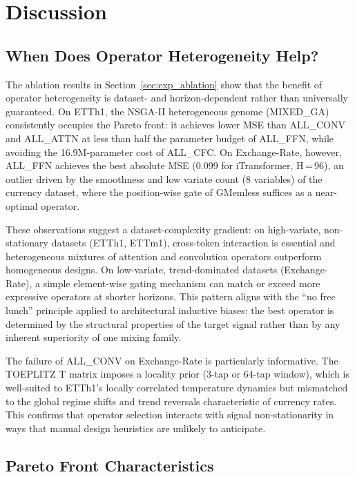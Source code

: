 \section{Discussion}
\label{sec:discussion}

\subsection{When Does Operator Heterogeneity Help?}

The ablation results in Section~\ref{sec:exp_ablation} show that the benefit of operator heterogeneity is dataset- and horizon-dependent rather than universally guaranteed.
On ETTh1, the NSGA-II heterogeneous genome (MIXED\_GA) consistently occupies the Pareto front: it achieves lower MSE than ALL\_CONV and ALL\_ATTN at less than half the parameter budget of ALL\_FFN, while avoiding the 16.9M-parameter cost of ALL\_CFC.
On Exchange-Rate, however, ALL\_FFN achieves the best absolute MSE (0.099 for iTransformer, H\,=\,96), an outlier driven by the smoothness and low variate count (8 variables) of the currency dataset, where the position-wise gate of GMemless suffices as a near-optimal operator.

These observations suggest a dataset-complexity gradient: on high-variate, non-stationary datasets (ETTh1, ETTm1), cross-token interaction is essential and heterogeneous mixtures of attention and convolution operators outperform homogeneous designs.
On low-variate, trend-dominated datasets (Exchange-Rate), a simple element-wise gating mechanism can match or exceed more expressive operators at shorter horizons.
This pattern aligns with the ``no free lunch'' principle applied to architectural inductive biases: the best operator is determined by the structural properties of the target signal rather than by any inherent superiority of one mixing family.

The failure of ALL\_CONV on Exchange-Rate is particularly informative.
The TOEPLITZ T matrix imposes a locality prior (3-tap or 64-tap window), which is well-suited to ETTh1's locally correlated temperature dynamics but mismatched to the global regime shifts and trend reversals characteristic of currency rates.
This confirms that operator selection interacts with signal non-stationarity in ways that manual design heuristics are unlikely to anticipate.

\subsection{Pareto Front Characteristics}

